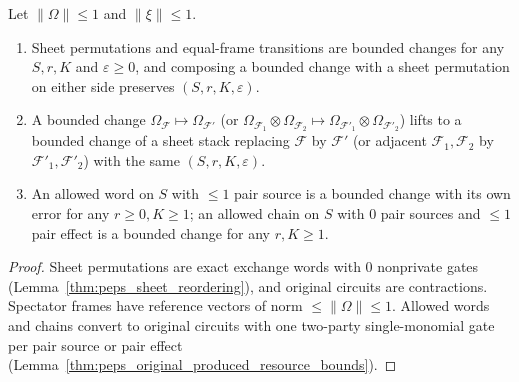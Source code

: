\begin{lemma}
    \label{thm:peps_bounded_change_closure}
    \leanok
    Let $\lVert\Omega\rVert\le1$ and $\lVert\xi\rVert\le1$.
    \begin{enumerate}
        \item Sheet permutations and equal-frame transitions are bounded changes for any $S,r,K$ and $\varepsilon\ge0$, and composing a bounded change with a sheet permutation on either side preserves $(S,r,K,\varepsilon)$.
        \item A bounded change $\Omega_{\mathcal F}\mapsto\Omega_{\mathcal F'}$ (or $\Omega_{\mathcal F_1}\otimes\Omega_{\mathcal F_2}\mapsto\Omega_{\mathcal F'_1}\otimes\Omega_{\mathcal F'_2}$) lifts to a bounded change of a sheet stack replacing $\mathcal F$ by $\mathcal F'$ (or adjacent $\mathcal F_1,\mathcal F_2$ by $\mathcal F'_1,\mathcal F'_2$) with the same $(S,r,K,\varepsilon)$.
        \item An allowed word on $S$ with $\le1$ pair source is a bounded change with its own error for any $r\ge0,K\ge1$; an allowed chain on $S$ with $0$ pair sources and $\le1$ pair effect is a bounded change for any $r,K\ge1$.
    \end{enumerate}
\end{lemma}

\begin{proof}\leanok
    Sheet permutations are exact exchange words with $0$ nonprivate gates (Lemma~\ref{thm:peps_sheet_reordering}), and original circuits are contractions. Spectator frames have reference vectors of norm $\le\lVert\Omega\rVert\le1$. Allowed words and chains convert to original circuits with one two-party single-monomial gate per pair source or pair effect (Lemma~\ref{thm:peps_original_produced_resource_bounds}).
\end{proof}

